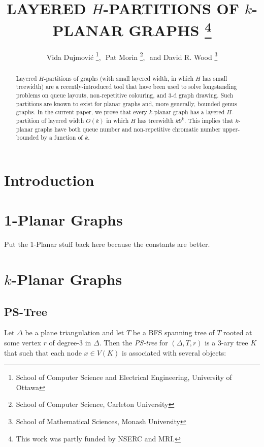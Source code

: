 \documentclass{patmorin}
\title{\MakeUppercase{Layered $H$-Partitions of $k$-Planar Graphs}%
    \thanks{This work was partly funded by NSERC and MRI.}}
\author{Vida Dujmovi\'c%
        \thanks{School of Computer Science and Electrical Engineering,
                University of Ottawa},\,\,
        Pat Morin%
        \thanks{School of Computer Science, Carleton University},\,\, and
        David R. Wood%
        \thanks{School of Mathematical Sciences, Monash University}}
\begin{document}
\maketitle


\begin{abstract}
  Layered $H$-partitions of graphs (with small layered width, in which $H$ has small treewidth) are a recently-introduced tool that have been used to solve longstanding problems on queue layouts, non-repetitive colouring, and 3-d graph drawing.  Such partitions are known to exist for planar graphs and, more generally, bounded genus graphs.  In the current paper, we prove that every $k$-planar graph has a layered $H$-partition of layered width $O(k)$ in which $H$ has treewidth $k9^k$. This implies that $k$-planar graphs have both queue number and non-repetitive chromatic number upper-bounded by a function of $k$.
\end{abstract}

\section{Introduction}


\section{1-Planar Graphs}

Put the 1-Planar stuff back here because the constants are better.

\section{$k$-Planar Graphs}

\subsection{PS-Tree}

Let $\Delta$ be a plane triangulation and let $T$ be a BFS spanning tree of $T$ rooted at some vertex $r$ of degree-3 in $\Delta$.  Then the \emph{PS-tree} for $(\Delta, T, r)$ is a 3-ary tree $K$ that such that each node $x\in V(K)$ is associated with several objects:
\end{document}
